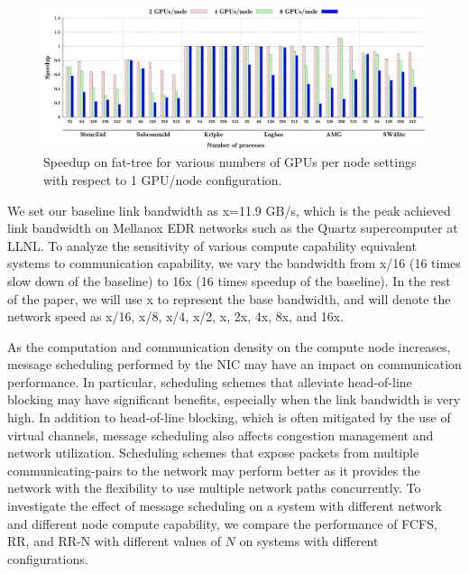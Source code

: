 \begin{figure}[t]
\centering
\includegraphics[width=\textwidth]{plots/ftree/map/ftree-mapping-all.eps}
\caption{Speedup on fat-tree for various numbers of GPUs per node settings with
respect to 1 GPU/node configuration.}
\label{fig:ftree_gpu}
\end{figure}

\vspace{0.08in}
We set our baseline link bandwidth as x=11.9 GB/s, which is the peak achieved
link bandwidth on Mellanox EDR networks such as
the Quartz supercomputer at LLNL. To analyze the
sensitivity of various compute capability equivalent systems to communication capability, we vary the bandwidth
from x/16 (16 times slow down of the baseline) to 16x (16 times speedup of the
baseline). In the rest of the paper, we will use x to represent the base
bandwidth, and will denote the network speed as x/16, x/8, x/4, x/2, x, 2x, 4x,
8x, and 16x.  


\vspace{0.08in}
As the computation and communication density
on the compute node increases, message scheduling performed by the
NIC may have an impact on
communication performance. In particular, scheduling schemes that alleviate
head-of-line blocking may have significant benefits, especially when the link
bandwidth is very high. In addition to head-of-line blocking, which is often mitigated
by the use of virtual channels, message scheduling also affects congestion management and network
utilization. Scheduling schemes that expose packets from multiple communicating-pairs
to the network may perform better as it provides the network with the flexibility to
use multiple network paths concurrently. To investigate the effect of message scheduling
on a system with different network and different node compute capability, we compare the performance
of FCFS, RR, and RR-N with different values of $N$ on systems with different configurations. 

